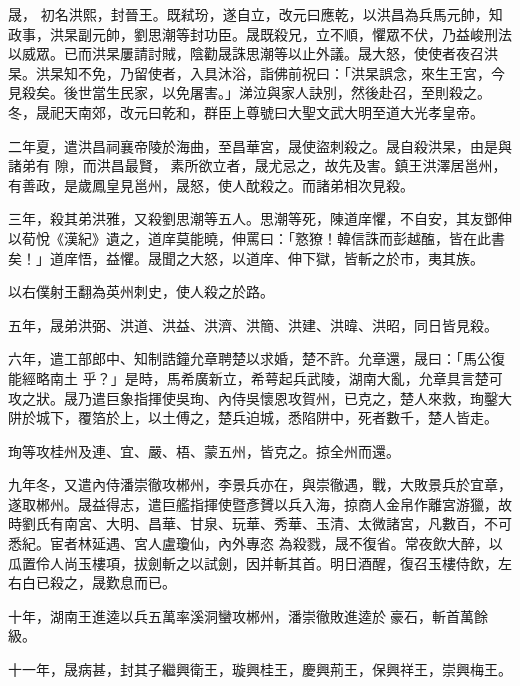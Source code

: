 \begin{pinyinscope}
 晟，
 初名洪熙，封晉王。既弒玢，遂自立，改元曰應乾，以洪昌為兵馬元帥，知政事，洪杲副元帥，劉思潮等封功臣。晟既殺兄，立不順，懼眾不伏，乃益峻刑法以威眾。已而洪杲屢請討賊，陰勸晟誅思潮等以止外議。晟大怒，使使者夜召洪杲。洪杲知不免，乃留使者，入具沐浴，詣佛前祝曰：「洪杲誤念，來生王宮，今見殺矣。後世當生民家，以免屠害。」涕泣與家人訣別，然後赴召，至則殺之。冬，晟祀天南郊，改元曰乾和，群臣上尊號曰大聖文武大明至道大光孝皇帝。



 二年夏，遣洪昌祠襄帝陵於海曲，至昌華宮，晟使盜刺殺之。晟自殺洪杲，由是與諸弟有
 隙，而洪昌最賢，素所欲立者，晟尤忌之，故先及害。鎮王洪澤居邕州，有善政，是歲鳳皇見邕州，晟怒，使人酖殺之。而諸弟相次見殺。



 三年，殺其弟洪雅，又殺劉思潮等五人。思潮等死，陳道庠懼，不自安，其友鄧伸以荀悅《漢紀》遺之，道庠莫能曉，伸罵曰：「憝獠！韓信誅而彭越醢，皆在此書矣！」道庠悟，益懼。晟聞之大怒，以道庠、伸下獄，皆斬之於市，夷其族。



 以右僕射王翻為英州刺史，使人殺之於路。



 五年，晟弟洪弼、洪道、洪益、洪濟、洪簡、洪建、洪暐、洪昭，同日皆見殺。



 六年，遣工部郎中、知制誥鐘允章聘楚以求婚，楚不許。允章還，晟曰：「馬公復能經略南土
 乎？」是時，馬希廣新立，希萼起兵武陵，湖南大亂，允章具言楚可攻之狀。晟乃遣巨象指揮使吳珣、內侍吳懷恩攻賀州，已克之，楚人來救，珣鑿大阱於城下，覆箔於上，以土傅之，楚兵迫城，悉陷阱中，死者數千，楚人皆走。



 珣等攻桂州及連、宜、嚴、梧、蒙五州，皆克之。掠全州而還。



 九年冬，又遣內侍潘崇徹攻郴州，李景兵亦在，與崇徹遇，戰，大敗景兵於宜章，遂取郴州。晟益得志，遣巨艦指揮使暨彥贇以兵入海，掠商人金帛作離宮游獵，故時劉氏有南宮、大明、昌華、甘泉、玩華、秀華、玉清、太微諸宮，凡數百，不可悉紀。宦者林延遇、宮人盧瓊仙，內外專恣
 為殺戮，晟不復省。常夜飲大醉，以瓜置伶人尚玉樓項，拔劍斬之以試劍，因并斬其首。明日酒醒，復召玉樓侍飲，左右白已殺之，晟歎息而已。



 十年，湖南王進逵以兵五萬率溪洞蠻攻郴州，潘崇徹敗進逵於豪石，斬首萬餘級。



 十一年，晟病甚，封其子繼興衛王，璇興桂王，慶興荊王，保興祥王，崇興梅王。




\end{pinyinscope}
